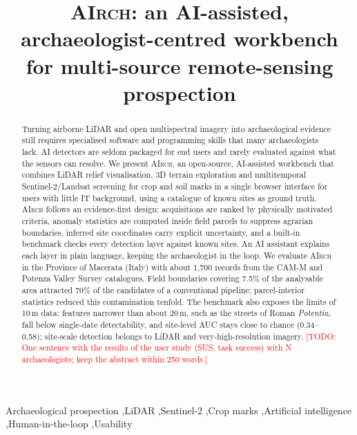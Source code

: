 \documentclass[review,authoryear,12pt]{elsarticle}
\newcommand{\airch}{\textsc{AIrch}}
\newcommand{\todo}[1]{\textcolor{red}{[TODO: #1]}}
\begin{document}
\begin{frontmatter}

\title{\airch: an AI-assisted, archaeologist-centred workbench for multi-source remote-sensing prospection}


\begin{abstract}
Turning airborne LiDAR and open multispectral imagery into archaeological evidence still requires specialised software and programming skills that many archaeologists lack. AI detectors are seldom packaged for end users and rarely evaluated against what the sensors can resolve. We present \airch, an open-source, AI-assisted workbench that combines LiDAR relief visualisation, 3D terrain exploration and multitemporal Sentinel-2/Landsat screening for crop and soil marks in a single browser interface for users with little IT background, using a catalogue of known sites as ground truth. \airch{} follows an evidence-first design: acquisitions are ranked by physically motivated criteria, anomaly statistics are computed inside field parcels to suppress agrarian boundaries, inferred site coordinates carry explicit uncertainty, and a built-in benchmark checks every detection layer against known sites. An AI assistant explains each layer in plain language, keeping the archaeologist in the loop. We evaluate \airch{} in the Province of Macerata (Italy) with about 1,700 records from the CAM-M and Potenza Valley Survey catalogues. Field boundaries covering 7.5\% of the analysable area attracted 70\% of the candidates of a conventional pipeline; parcel-interior statistics reduced this contamination tenfold. The benchmark also exposes the limits of 10\,m data: features narrower than about 20\,m, such as the streets of Roman \textit{Potentia}, fall below single-date detectability, and site-level AUC stays close to chance (0.34--0.58); site-scale detection belongs to LiDAR and very-high-resolution imagery. \todo{One sentence with the results of the user study (SUS, task success) with N archaeologists; keep the abstract within 250 words.}
\end{abstract}

\begin{keyword}
Archaeological prospection \sep LiDAR \sep Sentinel-2 \sep Crop marks \sep Artificial intelligence \sep Human-in-the-loop \sep Usability
\end{keyword}

\end{frontmatter}












\end{document}
